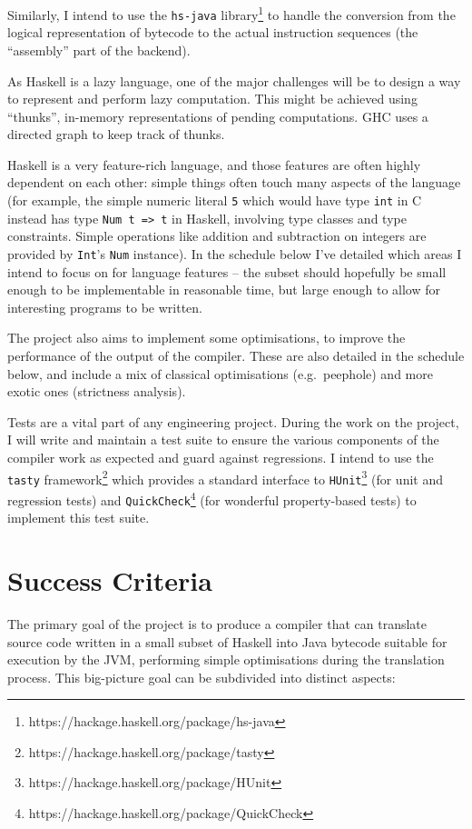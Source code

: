 \documentclass[12pt]{article}
\newcommand\haskell[1]{\texttt{#1}}
\newcommand\monospace[1]{\texttt{#1}}
\begin{document}
Similarly, I intend to use the \monospace{hs-java} library\footnote{https://hackage.haskell.org/package/hs-java} to
handle the conversion from the logical representation of bytecode to the actual instruction sequences (the ``assembly''
part of the backend).

As Haskell is a lazy language, one of the major challenges will be to design a way to represent and perform lazy
computation. This might be achieved using ``thunks'', in-memory representations of pending computations. GHC uses a
directed graph to keep track of thunks.

Haskell is a very feature-rich language, and those features are often highly dependent on each other: simple things
often touch many aspects of the language (for example, the simple numeric literal \haskell{5} which would have type
\texttt{int} in C instead has type \haskell{Num t => t} in Haskell, involving type classes and type constraints.
Simple operations like addition and subtraction on integers are provided by \haskell{Int}'s \haskell{Num} instance). In
the schedule below I've detailed which areas I intend to focus on for language features -- the subset should hopefully
be small enough to be implementable in reasonable time, but large enough to allow for interesting programs to be
written.

The project also aims to implement some optimisations, to improve the performance of the output of the compiler. These
are also detailed in the schedule below, and include a mix of classical optimisations (e.g.\ peephole) and more exotic
ones (strictness analysis).

Tests are a vital part of any engineering project. During the work on the project, I will write and maintain a test suite
to ensure the various components of the compiler work as expected and guard against regressions. I intend to use the
\monospace{tasty} framework\footnote{https://hackage.haskell.org/package/tasty} which provides a standard interface to
\monospace{HUnit}\footnote{https://hackage.haskell.org/package/HUnit} (for unit and regression tests) and
\monospace{QuickCheck}\footnote{https://hackage.haskell.org/package/QuickCheck} (for wonderful property-based tests) to
implement this test suite.


\section*{Success Criteria}

The primary goal of the project is to produce a compiler that can translate source code written in a small subset of
Haskell into Java bytecode suitable for execution by the JVM, performing simple optimisations during the translation
process. This big-picture goal can be subdivided into distinct aspects:
\end{document}
